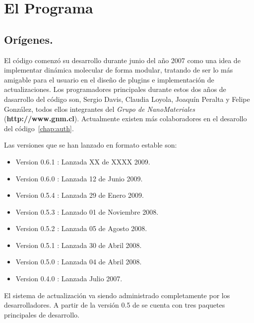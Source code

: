 \chapter{El Programa}
\label{chap:lpmd}

\section{Or\'igenes.}

El c\'odigo {\lpmd} comenz\'o su desarrollo durante junio del a\~no 2007 como una idea de implementar din\'amica molecular de forma modular, tratando de ser lo m\'as amigable para el usuario en el dise\~no de plugins e implementaci\'on de actualizaciones. Los programadores principales durante estos dos años de dasarrollo del c\'odigo son, Sergio Davis, Claudia Loyola, Joaqu\'in Peralta y Felipe Gonz\'alez, todos ellos integrantes del \textit{Grupo de NanoMateriales} (\textbf{http://www.gnm.cl}). Actualmente existen m\'as colaboradores en el desarollo del c\'odigo~\ref{chap:auth}.

Las versiones que se han lanzado en formato estable son:

\begin{itemize}
 \item Version 0.6.1 : Lanzada XX de XXXX 2009.
 \item Version 0.6.0 : Lanzada 12 de Junio 2009.
 \item Version 0.5.4 : Lanzada 29 de Enero 2009.
 \item Version 0.5.3 : Lanzado 01 de Noviembre 2008.
 \item Version 0.5.2 : Lanzada 05 de Agosto 2008.
 \item Version 0.5.1 : Lanzada 30 de Abril 2008.
 \item Version 0.5.0 : Lanzada 04 de Abril 2008.
 \item Version 0.4.0 : Lanzada Julio 2007.
\end{itemize}

El sistema de actualizaci\'on va siendo administrado completamente por los desarrolladores. A partir de la versi\'on 0.5 de {\lpmd} se cuenta con tres paquetes principales de desarrollo.

